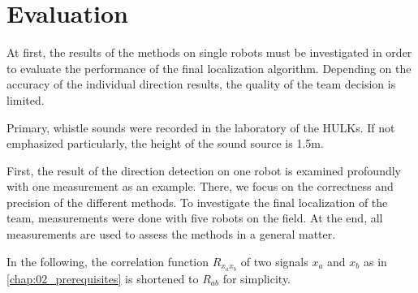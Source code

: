 \chapter{Evaluation}

At first, the results of the methods on single robots must be investigated
in order to evaluate the performance of the final localization algorithm.
Depending on the accuracy of the individual direction results, the quality
of the team decision is limited.

Primary, whistle sounds were recorded in the laboratory of the HULKs.
If not emphasized particularly, the height of the sound source is 1.5\si{m}.

First, the result of the direction detection on one robot
is examined profoundly with one measurement as an example.
There, we focus on the correctness and precision of the different methods.
To investigate the final localization of the team, measurements were
done with five robots on the field.
At the end, all measurements are used to assess the methods in a general matter.

In the following, the correlation function $R_{x_ax_b}$ of two signals
$x_a$ and $x_b$ as in \cref{chap:02_prerequisites} is shortened
to $R_{ab}$ for simplicity.



